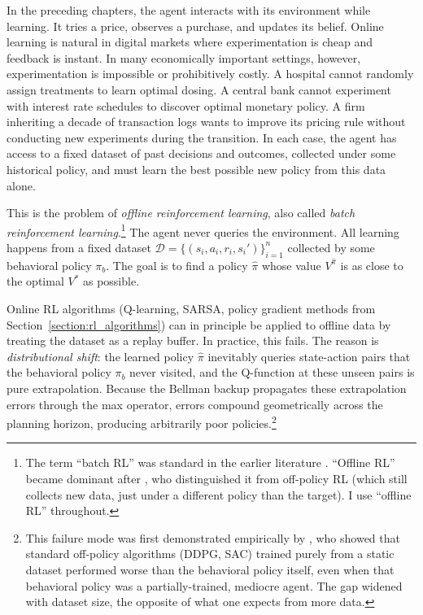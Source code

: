 In the preceding chapters, the agent interacts with its environment while learning. It tries a price, observes a purchase, and updates its belief. Online learning is natural in digital markets where experimentation is cheap and feedback is instant. In many economically important settings, however, experimentation is impossible or prohibitively costly. A hospital cannot randomly assign treatments to learn optimal dosing. A central bank cannot experiment with interest rate schedules to discover optimal monetary policy. A firm inheriting a decade of transaction logs wants to improve its pricing rule without conducting new experiments during the transition. In each case, the agent has access to a fixed dataset of past decisions and outcomes, collected under some historical policy, and must learn the best possible new policy from this data alone.

This is the problem of \textit{offline reinforcement learning}, also called \textit{batch reinforcement learning}.\footnote{The term ``batch RL'' was standard in the earlier literature \citep{Ernst2005, Lange2012}. ``Offline RL'' became dominant after \citet{Levine2020}, who distinguished it from off-policy RL (which still collects new data, just under a different policy than the target). I use ``offline RL'' throughout.} The agent never queries the environment. All learning happens from a fixed dataset $\mathcal{D} = \{(s_i, a_i, r_i, s_i')\}_{i=1}^n$ collected by some behavioral policy $\pi_b$. The goal is to find a policy $\hat{\pi}$ whose value $V^{\hat{\pi}}$ is as close to the optimal $V^*$ as possible.

Online RL algorithms (Q-learning, SARSA, policy gradient methods from Section~\ref{section:rl_algorithms}) can in principle be applied to offline data by treating the dataset as a replay buffer. In practice, this fails. The reason is \textit{distributional shift}: the learned policy $\hat{\pi}$ inevitably queries state-action pairs that the behavioral policy $\pi_b$ never visited, and the Q-function at these unseen pairs is pure extrapolation. Because the Bellman backup propagates these extrapolation errors through the max operator, errors compound geometrically across the planning horizon, producing arbitrarily poor policies.\footnote{This failure mode was first demonstrated empirically by \citet{Fujimoto2019}, who showed that standard off-policy algorithms (DDPG, SAC) trained purely from a static dataset performed worse than the behavioral policy itself, even when that behavioral policy was a partially-trained, mediocre agent. The gap widened with dataset size, the opposite of what one expects from more data.}

